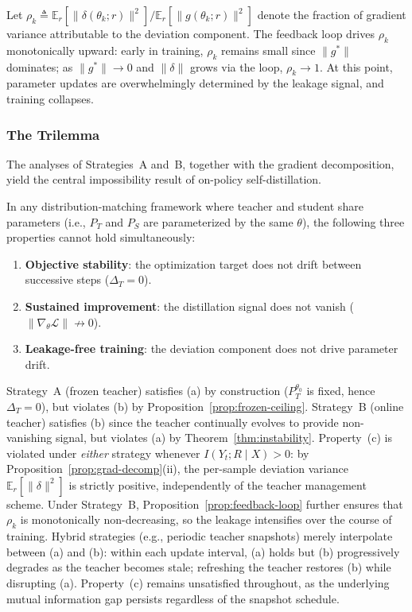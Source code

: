 \documentclass[]{jingdong}
\begin{document}
Let $\rho_k \triangleq \mathbb{E}_r[\|\delta(\theta_k; r)\|^2] \big/ \mathbb{E}_r[\|g(\theta_k; r)\|^2]$ denote the fraction of gradient variance attributable to the deviation component. The feedback loop drives $\rho_k$ monotonically upward: early in training, $\rho_k$ remains small since $\|g^*\|$ dominates; as $\|g^*\| \to 0$ and $\|\delta\|$ grows via the loop, $\rho_k \to 1$. At this point, parameter updates are overwhelmingly determined by the leakage signal, and training collapses.


\subsubsection{The Trilemma}

The analyses of Strategies~A and~B, together with the gradient decomposition, yield the central impossibility result of on-policy self-distillation.

\begin{theorem}
\label{thm:trilemma}
In any distribution-matching framework where teacher and student share parameters (i.e., $P_T$ and $P_S$ are parameterized by the same $\theta$), the following three properties cannot hold simultaneously:
\begin{enumerate}[label=(\alph*),nosep]
    \item \textbf{Objective stability}: the optimization target does not drift between successive steps ($\Delta_T = 0$).
    \item \textbf{Sustained improvement}: the distillation signal does not vanish ($\|\nabla_\theta \mathcal{L}\| \not\to 0$).
    \item \textbf{Leakage-free training}: the deviation component does not drive parameter drift.
\end{enumerate}
\end{theorem}


Strategy~A (frozen teacher) satisfies (a) by construction ($P_T^{\theta_0}$ is fixed, hence $\Delta_T = 0$), but violates (b) by Proposition~\ref{prop:frozen-ceiling}. Strategy~B (online teacher) satisfies (b) since the teacher continually evolves to provide non-vanishing signal, but violates (a) by Theorem~\ref{thm:instability}. Property~(c) is violated under \textit{either} strategy whenever $I(Y_t; R \mid X) > 0$: by Proposition~\ref{prop:grad-decomp}(ii), the per-sample deviation variance $\mathbb{E}_r[\|\delta\|^2]$ is strictly positive, independently of the teacher management scheme. Under Strategy~B, Proposition~\ref{prop:feedback-loop} further ensures that $\rho_k$ is monotonically non-decreasing, so the leakage intensifies over the course of training. Hybrid strategies (e.g., periodic teacher snapshots) merely interpolate between (a) and (b): within each update interval, (a) holds but (b) progressively degrades as the teacher becomes stale; refreshing the teacher restores (b) while disrupting (a). Property~(c) remains unsatisfied throughout, as the underlying mutual information gap persists regardless of the snapshot schedule.
\end{document}

